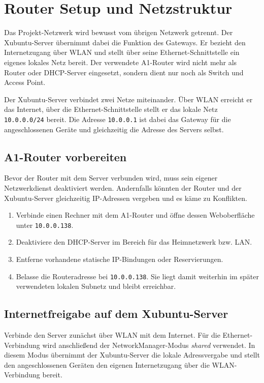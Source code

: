 \section{Router Setup und Netzstruktur}

Das Projekt-Netzwerk wird bewusst vom übrigen Netzwerk getrennt. Der Xubuntu-Server übernimmt dabei die Funktion des Gateways. Er bezieht den Internetzugang über WLAN und stellt über seine Ethernet-Schnittstelle ein eigenes lokales Netz bereit. Der verwendete A1-Router wird nicht mehr als Router oder DHCP-Server eingesetzt, sondern dient nur noch als Switch und Access Point.

Der Xubuntu-Server verbindet zwei Netze miteinander. Über WLAN erreicht er das Internet, über die Ethernet-Schnittstelle stellt er das lokale Netz \texttt{10.0.0.0/24} bereit. Die Adresse \texttt{10.0.0.1} ist dabei das Gateway für die angeschlossenen Geräte und gleichzeitig die Adresse des Servers selbst.

\subsection{A1-Router vorbereiten}

Bevor der Router mit dem Server verbunden wird, muss sein eigener Netzwerkdienst deaktiviert werden. Andernfalls könnten der Router und der Xubuntu-Server gleichzeitig IP-Adressen vergeben und es käme zu Konflikten.

\begin{enumerate}
    \item Verbinde einen Rechner mit dem A1-Router und öffne dessen Weboberfläche unter \texttt{10.0.0.138}. 
    \item Deaktiviere den DHCP-Server im Bereich für das Heimnetzwerk bzw. LAN.
    \item Entferne vorhandene statische IP-Bindungen oder Reservierungen.
    \item Belasse die Routeradresse bei \texttt{10.0.0.138}. Sie liegt damit weiterhin im später verwendeten lokalen Subnetz und bleibt erreichbar.
\end{enumerate}

\subsection{Internetfreigabe auf dem Xubuntu-Server}

Verbinde den Server zunächst über WLAN mit dem Internet. Für die Ethernet-Verbindung wird anschließend der NetworkManager-Modus \textit{shared} verwendet. In diesem Modus übernimmt der Xubuntu-Server die lokale Adressvergabe und stellt den angeschlossenen Geräten den eigenen Internetzugang über die WLAN-Verbindung bereit.

